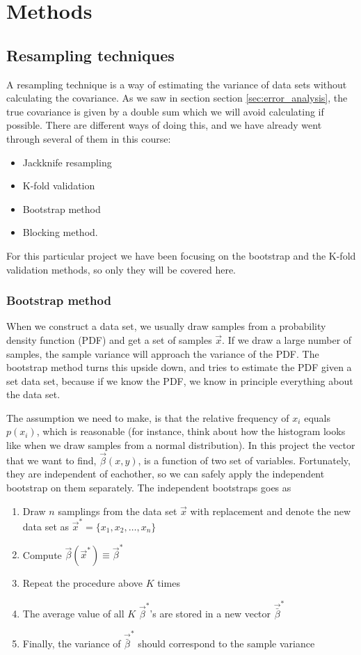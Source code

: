 \section{Methods} \label{sec:methods}

\subsection{Resampling techniques} \label{sec:resampling}
A resampling technique is a way of estimating the variance of data sets without calculating the covariance. As we saw in section section \ref{sec:error_analysis}, the true covariance is given by a double sum which we will avoid calculating if possible. There are different ways of doing this, and we have already went through several of them in this course:
\begin{itemize}
\item{Jackknife resampling}
\item{K-fold validation}
\item{Bootstrap method}
\item{Blocking method}.
\end{itemize}

For this particular project we have been focusing on the bootstrap and the K-fold validation methods, so only they will be covered here.

\subsubsection{Bootstrap method} \label{sec:bootstrap}
When we construct a data set, we usually draw samples from a probability density function (PDF) and get a set of samples $\vec{x}$. If we draw a large number of samples, the sample variance will approach the variance of the PDF. The bootstrap method turns this upside down, and tries to estimate the PDF given a set data set, because if we know the PDF, we know in principle everything about the data set. 

The assumption we need to make, is that the relative frequency of $x_i$ equals $p(x_i)$, which is reasonable (for instance, think about how the histogram looks like when we draw samples from a normal distribution). In this project the vector that we want to find, $\vec{\beta}(x,y)$, is a function of two set of variables. Fortunately, they are independent of eachother, so we can safely apply the independent bootstrap on them separately. The independent bootstraps goes as
\begin{enumerate}
\item Draw $n$ samplings from the data set $\vec{x}$ with replacement and denote the new data set as $\vec{x}^*=\{x_1,x_2,\hdots,x_n\}$
\item Compute $\vec{\beta}(\vec{x}^*)\equiv\vec{\beta}^*$
\item Repeat the procedure above $K$ times
\item The average value of all $K$ $\vec{\beta}^*$'s are stored in a new vector $\vec{\bar{\beta}}^*$
\item Finally, the variance of $\vec{\bar{\beta}}^*$ should correspond to the sample variance
\end{enumerate}
\cite{Bootstrap}


